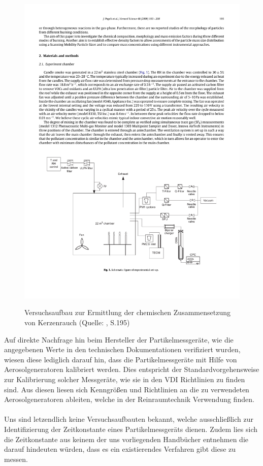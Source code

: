 \begin{figure}[H]
	\myfloatalign
	{\includegraphics[width=.9\linewidth]{gfx/related/kerze_versuch.pdf}} \quad
	\caption[Versuchsaufbau zur Ermittlung der chemischen Zusammensetzung von Kerzenrauch (Quelle: \cite{kerze}, S.195)]
	{Versuchsaufbau zur Ermittlung der chemischen Zusammensetzung von Kerzenrauch (Quelle: \cite{kerze}, S.195)}
	\label{fig:kerze_exp}
\end{figure} 

Auf direkte Nachfrage hin beim Hersteller der Partikelmessger\"{a}te, wie die angegebenen Werte in den technischen Dokumentationen verifiziert wurden, wiesen diese lediglich darauf hin, dass die Partikelmessger\"{a}te mit Hilfe von Aerosolgeneratoren kalibriert werden. Dies entspricht der Standardvorgehensweise zur Kalibrierung solcher Messger\"{a}te, wie sie in den VDI Richtlinien zu finden sind. Aus diesen liesen sich Kenngr\"{o}{\ss}en und Richtlinien an die zu verwendeten Aerosolgeneratoren ableiten, welche in der Reinraumtechnik Verwendung finden.
\\\\
Uns sind letzendlich keine Versuchsaufbauten bekannt, welche ausschlie{\ss}lich zur Identifizierung der Zeitkonstante eines Partikelmessger\"{a}ts dienen. Zudem lies sich die Zeitkonstante aus keinem der uns vorliegenden Handb\"{u}cher entnehmen die darauf hindeuten w\"{u}rden, dass es ein existierendes Verfahren gibt diese zu messen. 